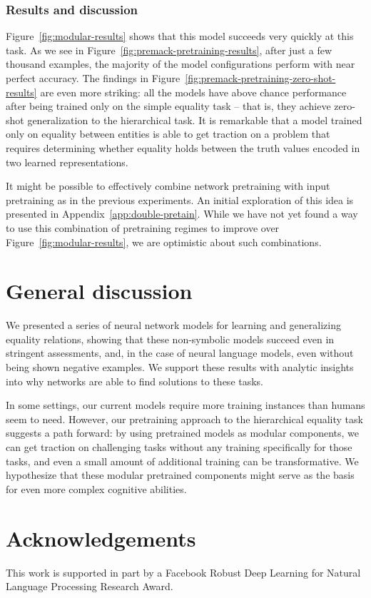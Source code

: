 \documentclass{article}
\newcommand{\Figref}[1]{Figure~\ref{#1}}
\newcommand{\figref}[1]{Figure~\ref{#1}}
\newcommand{\appref}[1]{Appendix~\ref{#1}}
\newcommand{\update}[1]{{\color{darkblue}#1}}
\begin{document}
\subsubsection{Results and discussion}

\update{\Figref{fig:modular-results} shows that this model succeeds very quickly at this task. As we see in \figref{fig:premack-pretraining-results}, after just a few thousand examples, the majority of the model configurations perform with near perfect accuracy. The findings in \figref{fig:premack-pretraining-zero-shot-results} are even more striking: all the models have above chance performance after being trained only on the simple equality task -- that is, they achieve zero-shot generalization to the hierarchical task.} It is remarkable that a model trained only on equality between entities is able to get traction on a problem that requires determining whether equality holds between the truth values encoded in two learned representations.

\update{
It might be possible to effectively combine network pretraining with input pretraining as in the previous experiments. An initial exploration of this idea is presented in \appref{app:double-pretain}. While we have not yet found a way to use this combination of pretraining regimes to improve over \figref{fig:modular-results}, we are optimistic about such combinations.}


\section{General discussion}

We presented a series of neural network models for learning and generalizing equality relations, showing that these non-symbolic models succeed even in stringent assessments, and, in the case of neural language models, even without being shown negative examples. We support these results with analytic insights into why networks are able to find solutions to these tasks.

In some settings, our current models require more training instances than humans seem to need. However, our pretraining approach to the hierarchical equality task suggests a path forward: by using pretrained models as modular components, we can get traction on challenging tasks without any training specifically for those tasks, and even a small amount of additional training can be transformative.  We hypothesize that these modular pretrained components might serve as the basis for even more complex cognitive abilities.


\section*{Acknowledgements}

\update{This work is supported in part by a Facebook Robust Deep Learning for Natural Language Processing Research Award.}






\end{document}
